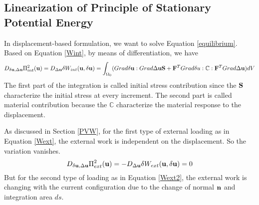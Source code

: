 %
\subsection{Linearization of Principle of Stationary Potential Energy}
In displacement-based formulation, we want to solve Equation \ref{equilibrium}. Based on Equation \ref{Wint}, by means of differentiation, we have
\begin{equation} \label{Kint}
D_{\delta\bold{u}, \Delta\bold{u}}\Pi_{int}^2(\bold{u}) = D_{\Delta{\bold{u}}}\delta{W_{int}}(\bold{u}, \delta{\bold{u}}) = \int_{\Omega_0}(Grad\delta\bold{u} : Grad\Delta\bold{u}\bold{S} + \bold{F}^TGrad\delta{u} : \mathbb{C} : \bold{F}^T Grad\Delta\bold{u})dV
\end{equation}
The first part of the integration is called initial stress contribution since the $\bold{S}$ characterize the initial stress at every increment. The second part is called material contribution because the $\mathbb{C}$ characterize the material response to the displacement.

As discussed in Section \ref{PVW}, for the first type of external loading as in  Equation \ref{Wext}, the external work is independent on the displacement. So the variation vanishes.
\begin{equation} \label{Kext}
D_{\delta\bold{u}, \Delta\bold{u}}\Pi_{ext}^2(\bold{u}) = - D_{\Delta{\bold{u}}}\delta{W_{ext}}(\bold{u}, \delta{\bold{u}}) = 0
\end{equation}
But for the second type of loading as in Equation \ref{Wext2}, the external work is changing with the current configuration due to the change of normal $\bold{n}$ and integration area $ds$. 

